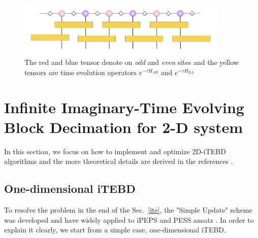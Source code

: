 \begin{figure}[ht]
	\centering
	\includegraphics[width=0.90\textwidth]{figures/fig312.png}
	\caption[The tensor diagram of imaginary time evolving block decimation.]{The red and blue tensor denote on \textit{odd} and \textit{even} sites and the yellow tensors are time evolution operators $e^{-\tau H_{AB}}$ and $e^{-\tau H_{BA}}$}
	\label{fig313}
\end{figure}
\section{Infinite Imaginary-Time Evolving Block Decimation for 2-D system}

In this section, we focus on how to implement and optimize 2D-iTEBD algorithms and the more theoretical details are derived in the references \cite{PhysRevLett.99.220405} \cite{PhysRevLett.101.090603} \cite{PhysRevB.78.155117}.
\label{itebd}
\subsection{One-dimensional iTEBD}
To resolve the problem in the end of the Sec.~\ref{ite}, the "Simple Update" scheme was developed and have widely applied to iPEPS and PESS ansatz \cite{PhysRevX.4.011025}. In order to explain it clearly, we start from a simple case, one-dimensional iTEBD. 

